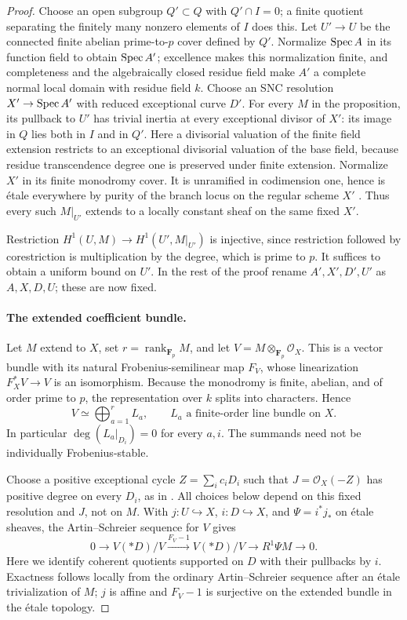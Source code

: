 \begin{proof}
Choose an open subgroup $Q'\subset Q$ with $Q'\cap I=0$; a finite
quotient separating the finitely many nonzero elements of $I$ does
this. Let $U'\to U$ be the connected finite abelian prime-to-$p$
cover defined by $Q'$. Normalize $\operatorname{Spec} A$ in its function field to
obtain $\operatorname{Spec} A'$; excellence makes this normalization finite, and
completeness and the algebraically closed residue field make $A'$
a complete normal local domain with residue field $k$.
Choose an SNC resolution $X'\to\operatorname{Spec} A'$ with reduced exceptional
curve $D'$. For every $M$ in the proposition, its pullback to $U'$
has trivial inertia at every exceptional divisor of $X'$: its image
in $Q$ lies both in $I$ and in $Q'$. Here a divisorial valuation of
the finite field extension restricts to an exceptional divisorial
valuation of the base field, because residue transcendence degree one
is preserved under finite extension. Normalize $X'$ in its finite
monodromy cover. It is unramified in codimension one, hence is
\'etale everywhere by purity of the branch locus on the regular
scheme $X'$ \cite[Lemma 58.21.4, tag 0BMB]{StacksBranchPurity}.
Thus every such $M|_{U'}$ extends to a locally constant
sheaf on the same fixed $X'$.

Restriction
$H^1(U,M)\to H^1(U',M|_{U'})$ is injective, since restriction followed
by corestriction is multiplication by the degree, which is prime to
$p$. It suffices to obtain a uniform bound on $U'$. In the rest of
the proof rename $A',X',D',U'$ as $A,X,D,U$; these are now fixed.

\paragraph{The extended coefficient bundle.}
Let $M$ extend to $X$, set $r=\operatorname{rank}_{\mathbf F_p}M$, and
let $V=M\otimes_{\mathbf F_p}\mathcal O_X$. This is a vector bundle
with its natural Frobenius-semilinear map $F_V$, whose linearization
$F_X^*V\to V$ is an isomorphism. Because the monodromy is finite,
abelian, and of order prime to $p$, the representation over $k$
splits into characters. Hence
\[
 V\simeq\bigoplus_{a=1}^r L_a,
 \qquad L_a\text{ a finite-order line bundle on }X.
\]
In particular $\deg(L_a|_{D_i})=0$ for every $a,i$.
The summands need not be individually Frobenius-stable.

Choose a positive exceptional cycle $Z=\sum_i c_iD_i$ such that
$J=\mathcal O_X(-Z)$ has positive degree on every $D_i$, as in
\cite[p.~6]{Suzuki2023}. All choices below depend on this fixed
resolution and $J$, not on $M$.
With $j:U\hookrightarrow X$, $i:D\hookrightarrow X$, and
$\Psi=i^*j_*$ on \'etale sheaves, the Artin--Schreier sequence for
$V$ gives
\[
 0\longrightarrow V(*D)/V
 \xrightarrow{F_V-1} V(*D)/V
 \longrightarrow R^1\Psi M\longrightarrow0.
\]
Here we identify coherent quotients supported on $D$ with their
pullbacks by $i$. Exactness follows locally from the ordinary
Artin--Schreier sequence after an \'etale trivialization of $M$;
$j$ is affine and $F_V-1$ is surjective on the extended bundle in
the \'etale topology.


\end{proof}
